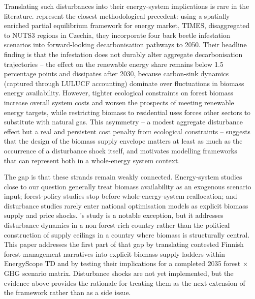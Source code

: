 \documentclass{article}
\begin{document}
Translating such disturbances into their energy-system implications is rare in the literature. \citet{reckaRoleBiomassDecarbonisation2023} represent the closest methodological precedent: using a spatially enriched partial equilibrium framework for energy market, TIMES, disaggregated to NUTS3 regions in Czechia, they incorporate four bark beetle infestation scenarios into forward-looking decarbonisation pathways to 2050. Their headline finding is that the infestation does not durably alter aggregate decarbonisation trajectories -- the effect on the renewable energy share remains below 1.5 percentage points and dissipates after 2030, because carbon-sink dynamics (captured through LULUCF accounting) dominate over fluctuations in biomass energy availability. However, tighter ecological constraints on forest biomass increase overall system costs and worsen the prospects of meeting renewable energy targets, while restricting biomass to residential uses forces other sectors to substitute with natural gas. This asymmetry -- a modest aggregate disturbance effect but a real and persistent cost penalty from ecological constraints -- suggests that the design of the biomass supply envelope matters at least as much as the occurrence of a disturbance shock itself, and motivates modelling frameworks that can represent both in a whole-energy system context.

The gap is that these strands remain weakly connected. Energy-system studies close to our question generally treat biomass availability as an exogenous scenario input; forest-policy studies stop before whole-energy-system reallocation; and disturbance studies rarely enter national optimisation models as explicit biomass supply and price shocks. \citeauthor{reckaRoleBiomassDecarbonisation2023}'s study is a notable exception, but it addresses disturbance dynamics in a non-forest-rich country rather than the political construction of supply ceilings in a country where biomass is structurally central. This paper addresses the first part of that gap by translating contested Finnish forest-management narratives into explicit biomass supply ladders within EnergyScope TD and by testing their implications for a completed 2035 forest \(\times\) GHG scenario matrix. Disturbance shocks are not yet implemented, but the evidence above provides the rationale for treating them as the next extension of the framework rather than as a side issue.
\end{document}
